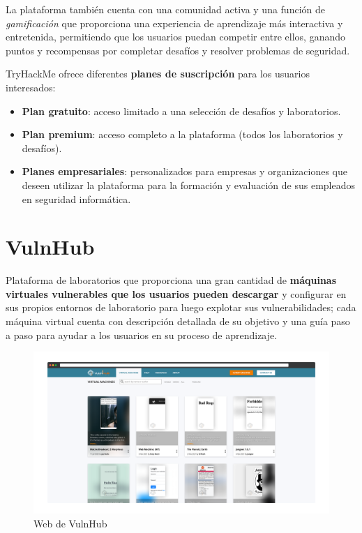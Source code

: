         La plataforma también cuenta con una comunidad activa y una función de \textit{gamificación} que proporciona una experiencia de aprendizaje más interactiva y entretenida, permitiendo que los usuarios puedan competir entre ellos, ganando puntos y recompensas por completar desafíos y resolver problemas de seguridad.
        
        TryHackMe ofrece diferentes \textbf{planes de suscripción} para los usuarios interesados:
        
        \begin{itemize}
            \item \textbf{Plan gratuito}: acceso limitado a una selección de desafíos y laboratorios.
        
            \item \textbf{Plan premium}: acceso completo a la plataforma (todos los laboratorios y desafíos).
        
            \item \textbf{Planes empresariales}: personalizados para empresas y organizaciones que deseen utilizar la plataforma para la formación y evaluación de sus empleados en seguridad informática.
        \end{itemize}
        
        \newpage
    
    
    \section{VulnHub}
    
        Plataforma de laboratorios que proporciona una gran cantidad de \textbf{máquinas virtuales vulnerables que los usuarios pueden descargar} y configurar en sus propios entornos de laboratorio para luego explotar sus vulnerabilidades; cada máquina virtual cuenta con descripción detallada de su objetivo y una guía paso a paso para ayudar a los usuarios en su proceso de aprendizaje.
        
        \begin{figure}[h]
            \centering

            \includegraphics[width=\textwidth]{images/Capturas/Web de VulnHub.png}

            \caption{Web de VulnHub}
            \label{fig:VulnHub-web}
        \end{figure}
        
